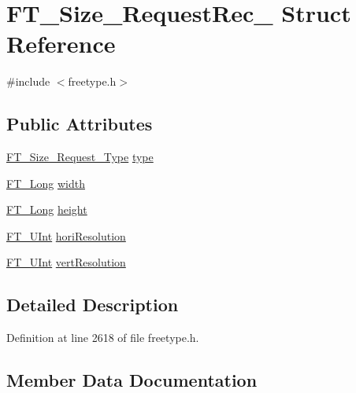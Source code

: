 \hypertarget{struct_f_t___size___request_rec__}{}\section{F\+T\+\_\+\+Size\+\_\+\+Request\+Rec\+\_\+ Struct Reference}
\label{struct_f_t___size___request_rec__}


{\ttfamily \#include $<$freetype.\+h$>$}

\subsection*{Public Attributes}
\begin{DoxyCompactItemize}
\item 
\mbox{\hyperlink{freetype_8h_ac10a6bdce0674edb378e81f8a19b6867}{F\+T\+\_\+\+Size\+\_\+\+Request\+\_\+\+Type}} \mbox{\hyperlink{struct_f_t___size___request_rec___a7644b04dd2b26c0698df558775320494}{type}}
\item 
\mbox{\hyperlink{fttypes_8h_a7fa72a1f0e79fb1860c5965789024d6f}{F\+T\+\_\+\+Long}} \mbox{\hyperlink{struct_f_t___size___request_rec___a7b044d36af318b053d5e3939eb0d5039}{width}}
\item 
\mbox{\hyperlink{fttypes_8h_a7fa72a1f0e79fb1860c5965789024d6f}{F\+T\+\_\+\+Long}} \mbox{\hyperlink{struct_f_t___size___request_rec___af8142450d8d032e1870d758cdcfa51a9}{height}}
\item 
\mbox{\hyperlink{fttypes_8h_abcb8db4dbf35d2b55a9e8c7b0926dc52}{F\+T\+\_\+\+U\+Int}} \mbox{\hyperlink{struct_f_t___size___request_rec___a3a85704d13561d9db53aa60f7805ec73}{hori\+Resolution}}
\item 
\mbox{\hyperlink{fttypes_8h_abcb8db4dbf35d2b55a9e8c7b0926dc52}{F\+T\+\_\+\+U\+Int}} \mbox{\hyperlink{struct_f_t___size___request_rec___a86601c38d91064b6efe256a9e99c56f4}{vert\+Resolution}}
\end{DoxyCompactItemize}


\subsection{Detailed Description}


Definition at line 2618 of file freetype.\+h.



\subsection{Member Data Documentation}
\mbox{\label{struct_f_t___size___request_rec___af8142450d8d032e1870d758cdcfa51a9}} 
